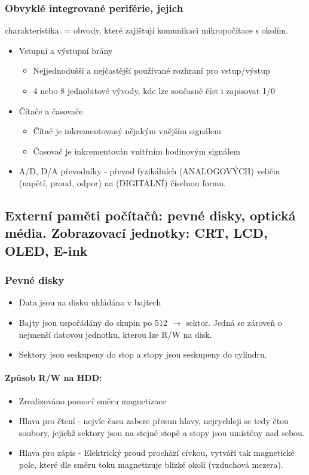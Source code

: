 \documentclass[10pt,a4paper]{article}
\begin{document}
\subsubsection{Obvyklé integrované periférie, jejich} charakteristika.
= obvody, které zajištují komunikaci mikropočítace s okolím.

\begin{itemize}
\item Vstupní a výstupní brány
\begin{itemize}
\item Nejjednodušší a nejčastější používané rozhraní pro vstup/výstup
\item 4 nebo 8 jednobitové vývody, kde lze současně číst i zapisovat 1/0
\end{itemize}
\item Čítače a časovače
\begin{itemize}
\item Čítač je inkrementovaný nějakým vnějším signálem
\item Časovač je inkrementován vnitřním hodinovým signálem
\end{itemize}
\item A/D, D/A převodníky - převod fyzikálních 
(ANALOGOVÝCH) veličin (napětí, proud, odpor) na (DIGITALNÍ) číselnou formu.
\end{itemize}
\subsection{Externí paměti počítačů: pevné disky, optická média. Zobrazovací jednotky: CRT, LCD, OLED, E-ink}
\subsubsection{Pevné disky}
\begin{itemize}
\item Data jsou na disku ukládána v bajtech
\item Bajty jsou uspořádány do skupin po 512 $\rightarrow$ sektor. Jedná se zároveň o nejmenší datovou jednotku, kterou lze R/W na disk.
\item Sektory jsou seskupeny do stop a stopy jsou seskupeny do cylindru.
\end{itemize}
\paragraph{Způsob R/W na HDD:}
\begin{itemize}
\item Zrealizováno pomocí směru magnetizace
\item Hlava pro čtení - nejvíc času zabere přesun hlavy, nejrychleji se tedy čtou soubory, jejichž sektory jsou na stejné stopě a stopy jsou umístěny nad sebou.
\item Hlava pro zápis - Elektrický proud prochází cívkou, vytváří tak magnetické pole, které dle směru toku magnetizuje blízké okolí (vzduchová mezera).
\end{itemize}
\end{document}
